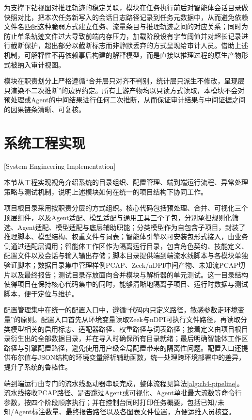 为支撑下钻视图对推理轨迹的稳定关联，模块在任务执行前后对智能体会话目录做快照对比，把本次任务新写入的会话日志路径记录到任务元数据中，从而避免依赖文件名匹配这种脆弱方式建立任务、流量条目与推理轨迹之间的对应关系；同时为防止单条轨迹文件过大导致前端内存压力，加载阶段设有字节阈值并对超长记录进行截断保护，超出部分以截断标志而非静默丢弃的方式呈现给审计人员。借助上述机制，可解释性不再依赖事后构建的解释模型，而是直接以推理过程的原生产物形式被纳入审计视图。

模块在职责划分上严格遵循“合并层只对齐不判别，统计层只派生不修改，呈现层只渲染不二次推断”的边界约定。所有上游产物均以只读方式读取，本模块不会对预处理或Agent的中间结果进行任何二次推断，从而保证审计结果与中间证据之间的因果链条清晰、可复核。

\section{系统工程实现}[System Engineering Implementation]

本节从工程实现视角介绍系统的目录组织、配置管理、端到端运行流程、异常处理策略与测试机制，说明上述模块如何在统一的项目结构下协同工作。

项目根目录采用按职责分层的方式组织。核心代码包括预处理、合并、可视化三个顶层组件，以及Agent适配、模型适配与通用工具三个子包，分别承担规则化筛选、Agent适配、模型适配与底层辅助职能；分类模型作为自包含子项目，封装了推理脚本、模型结构、权重文件与词表；智能体引擎以可安装包形式接入，由业务侧通过适配层调用；智能体工作区作为隔离运行目录，包含角色契约、技能定义、配置文件以及会话与输入输出存储；脚本目录提供端到端流水线脚本与各模块单独验证脚本；数据目录集中管理样例PCAP、Zeek/nDPI中间产物、未知流PCAP切片以及最终报告；测试目录存放面向合并模块与解析器的单元测试。这一目录结构使得项目在保持核心代码集中的同时，能够清晰地隔离子项目、运行时数据与测试脚本，便于定位与维护。

配置管理集中在统一的配置入口中，遵循“代码内只定义路径，敏感参数走环境变量”的原则。配置入口首先从环境变量读取Zeek与nDPI可执行文件路径，再读取分类模型相关的启用标志、适配器路径、权重路径与词表路径；接着定义由项目根目录衍生出的全部数据目录，并在导入时确保所有目录就绪；最后明确智能体工作区路径与引擎配置路径，避免使用用户级全局配置带来的隔离性问题。配置入口还提供布尔值与JSON结构的环境变量解析辅助函数，统一处理跨环境部署中的差异，提升了系统的鲁棒性。

端到端运行由专门的流水线驱动器串联完成，整体流程见算法\ref{alg:ch4-pipeline}。流水线接收PCAP路径、是否跳过Agent或可视化、Agent单批最大流数等命令行参数，按四个阶段顺序执行；并在控制台同时打印任务概要，包括已知/未知/Agent标注数量、最终报告路径以及各图表文件位置，方便运维人员核查。

